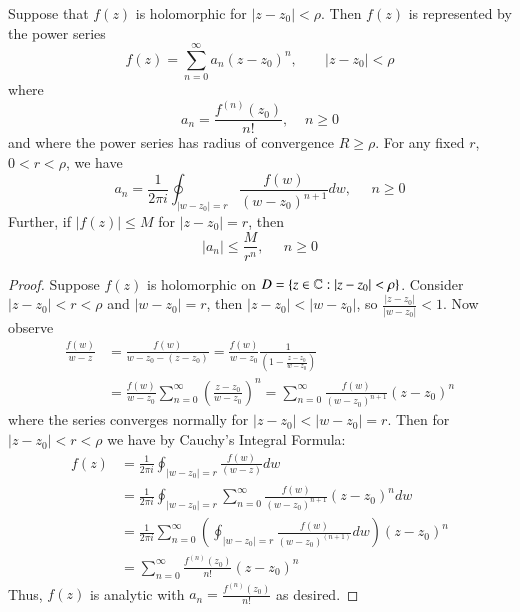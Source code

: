 \begin{theorem}
    Suppose that $f(z)$ is holomorphic for $|z - z_0| < \rho$. Then $f(z)$ is represented by the power series \begin{equation*}
        f(z) = \sum_{n=0}^{\infty}a_n(z-z_0)^n,\;\;\;\;\;\;\; |z-z_0| < \rho
    \end{equation*}
    where \begin{equation*}
        a_n = \frac{f^{(n)}(z_0)}{n!},\;\;\;\;n \geq 0
    \end{equation*}
    and where the power series has radius of convergence $R \geq \rho$. For any fixed $r$, $0 < r < \rho$, we have \begin{equation*}
        a_n = \frac{1}{2\pi i}\oint_{|w-z_0| = r}\frac{f(w)}{(w-z_0)^{n+1}}dw,\;\;\;\;\;n\geq 0
    \end{equation*}
    Further, if $|f(z)| \leq M$ for $|z-z_0| = r$, then \begin{equation*}
        |a_n| \leq \frac{M}{r^n},\;\;\;\;\; n \geq 0
    \end{equation*}
\end{theorem}
\begin{proof}
    Suppose $f(z)$ is holomorphic on $D = \{z \in \mathbb C:|z-z_0| < \rho\}$. Consider $|z-z_0| < r < \rho$ and $|w-z_0| = r$, then $|z-z_0| < |w-z_0|$, so $\frac{|z-z_0|}{|w-z_0|} < 1$. Now observe \begin{align*}
        \frac{f(w)}{w-z} &= \frac{f(w)}{w-z_0-(z-z_0)} = \frac{f(w)}{w-z_0}\frac{1}{\left(1-\frac{z-z_0}{w-z_0}\right)} \\
        &= \frac{f(w)}{w-z_0}\sum_{n=0}^{\infty}\left(\frac{z-z_0}{w-z_0}\right)^n = \sum_{n=0}^{\infty}\frac{f(w)}{(w-z_0)^{n+1}}(z-z_0)^n
    \end{align*}
    where the series converges normally for $|z-z_0| < |w-z_0| = r$. Then for $|z-z_0| < r < \rho$ we have by Cauchy's Integral Formula: \begin{align*}
        f(z) &= \frac{1}{2\pi i}\oint_{|w-z_0| = r}\frac{f(w)}{(w-z)}dw \\
        &= \frac{1}{2\pi i}\oint_{|w-z_0|=r}\sum_{n=0}^{\infty}\frac{f(w)}{(w-z_0)^{n+1}}(z-z_0)^ndw \\
        &= \frac{1}{2\pi i}\sum_{n=0}^{\infty}\left(\oint_{|w-z_0|=r}\frac{f(w)}{(w-z_0)^(n+1)}dw\right)(z-z_0)^n \\
        &= \sum_{n=0}^{\infty}\frac{f^{(n)}(z_0)}{n!}(z-z_0)^n
    \end{align*}
    Thus, $f(z)$ is analytic with $a_n = \frac{f^{(n)}(z_0)}{n!}$ as desired. 
\end{proof}


